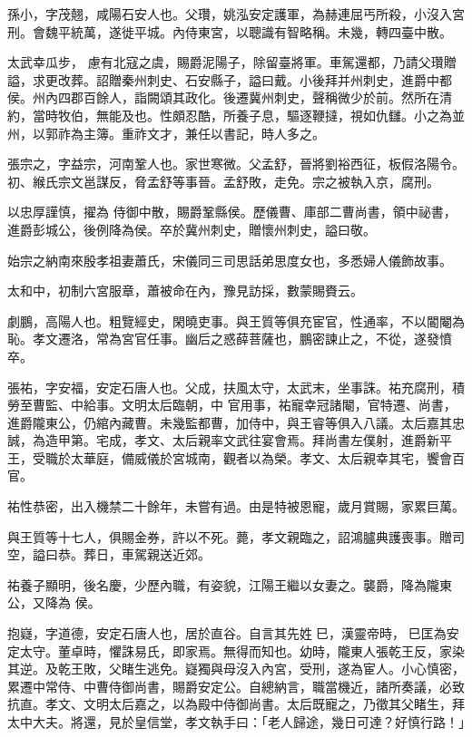 \begin{pinyinscope}
 孫小，字茂翹，咸陽石安人也。父瓚，姚泓安定護軍，為赫連屈丐所殺，小沒入宮刑。會魏平統萬，遂徙平城。內侍東宮，以聰識有智略稱。未幾，轉四臺中散。



 太武幸瓜步，
 慮有北寇之虞，賜爵泥陽子，除留臺將軍。車駕還都，乃請父瓚贈謚，求更改葬。詔贈秦州刺史、石安縣子，謚曰戴。小後拜并州刺史，進爵中都侯。州內四郡百餘人，詣闕頌其政化。後遷冀州刺史，聲稱微少於前。然所在清約，當時牧伯，無能及也。性頗忍酷，所養子息，驅逐鞭撻，視如仇讎。小之為並州，以郭祚為主簿。重祚文才，兼任以書記，時人多之。



 張宗之，字益宗，河南鞏人也。家世寒微。父孟舒，晉將劉裕西征，板假洛陽令。初、緱氏宗文邕謀反，脅孟舒等事晉。孟舒敗，走免。宗之被執入京，腐刑。



 以忠厚謹慎，擢為
 侍御中散，賜爵鞏縣侯。歷儀曹、庫部二曹尚書，領中祕書，進爵彭城公，後例降為侯。卒於冀州刺史，贈懷州刺史，謚曰敬。



 始宗之納南來殷孝祖妻蕭氏，宋儀同三司思話弟思度女也，多悉婦人儀飾故事。



 太和中，初制六宮服章，蕭被命在內，豫見訪採，數蒙賜賚云。



 劇鵬，高陽人也。粗覽經史，閑曉吏事。與王質等俱充宦官，性通率，不以閽閹為恥。孝文遷洛，常為宮官任事。幽后之惑薛菩薩也，鵬密諫止之，不從，遂發憤卒。



 張祐，字安福，安定石唐人也。父成，扶風太守，太武末，坐事誅。祐充腐刑，積勞至曹監、中給事。文明太后臨朝，中
 官用事，祐寵幸冠諸閹，官特遷、尚書，進爵隴東公，仍綰內藏曹。未幾監都曹，加侍中，與王睿等俱入八議。太后嘉其忠誠，為造甲第。宅成，孝文、太后親率文武往宴會焉。拜尚書左僕射，進爵新平王，受職於太華庭，備威儀於宮城南，觀者以為榮。孝文、太后親幸其宅，饗會百官。



 祐性恭密，出入機禁二十餘年，未嘗有過。由是特被恩寵，歲月賞賜，家累巨萬。



 與王質等十七人，俱賜金券，許以不死。薨，孝文親臨之，詔鴻臚典護喪事。贈司空，謚曰恭。葬日，車駕親送近郊。



 祐養子顯明，後名慶，少歷內職，有姿貌，江陽王繼以女妻之。襲爵，降為隴東公，又降為
 侯。



 抱嶷，字道德，安定石唐人也，居於直谷。自言其先姓巳，漢靈帝時，巳匡為安定太守。董卓時，懼誅易氏，即家焉。無得而知也。幼時，隴東人張乾王反，家染其逆。及乾王敗，父睹生逃免。嶷獨與母沒入內宮，受刑，遂為宦人。小心慎密，累遷中常侍、中曹侍御尚書，賜爵安定公。自總納言，職當機近，諸所奏議，必致抗直。孝文、文明太后嘉之，以為殿中侍御尚書。太后既寵之，乃徵其父睹生，拜太中大夫。將還，見於皇信堂，孝文執手曰：「老人歸途，幾日可達？好慎行路！」




\end{pinyinscope}
